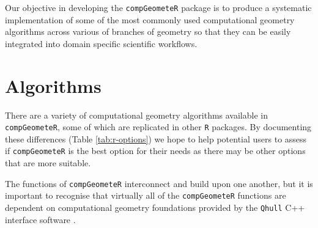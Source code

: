 \documentclass[12pt, a4paper]{article}
\begin{document}
Our objective in developing the \texttt{compGeometeR} package is to produce a systematic implementation of some of the most commonly used computational geometry algorithms across various of branches of geometry so that they can be easily integrated into domain specific scientific workflows.

\section{Algorithms}

There are a variety of computational geometry algorithms available in \texttt{compGeometeR}, some of which are replicated in other \texttt{R} packages.  By documenting these differences (Table \ref{tab:r-options}) we hope to help potential users to assess if \texttt{compGeometeR} is the best option for their needs as there may be other options that are more suitable.

The functions of \texttt{compGeometeR} interconnect and build upon one another, but it is important to recognise that virtually all of the \texttt{compGeometeR} functions are  dependent on computational geometry foundations provided by the \texttt{Qhull} C++ interface software \citep{barber-1996}.
\end{document}

